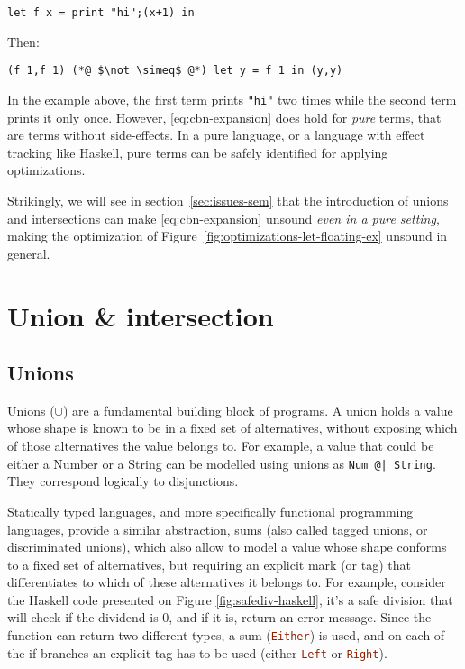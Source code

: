 \documentclass[sigplan,10pt,review,anonymous]{acmart}
\newcommand{\info}[2][1=]{}
\newcommand{\nickel}[1]{\lstinline[language=nickel]{#1}}
\newcommand{\haskell}[1]{\lstinline[language=Haskell]{#1}}
\begin{document}
\begin{lstlisting}[language=Nickel]
let f x = print "hi";(x+1) in
\end{lstlisting}

Then:

\begin{lstlisting}[language=Nickel]
(f 1,f 1) (*@ $\not \simeq$ @*) let y = f 1 in (y,y)
\end{lstlisting}

In the example above, the first term prints \nickel{"hi"} two times while the
second term prints it only once. However, \ref{eq:cbn-expansion} does hold for
\emph{pure} terms, that are terms without side-effects. In a pure language, or a
language with effect tracking like Haskell, pure terms can be safely identified for applying
optimizations.

Strikingly, we will see in section~\ref{sec:issues-sem} that the introduction of
unions and intersections can make \ref{eq:cbn-expansion} unsound
\emph{even in a pure setting}, making the optimization of
Figure~\ref{fig:optimizations-let-floating-ex} unsound in general.


\section{Union \& intersection}
\label{sec:union-inter}
\info{What are they, what are they used for.}


\subsection{Unions}
Unions ($\cup$) are a fundamental building block of programs.
A union holds a value whose
shape is known to be in a fixed set of alternatives, without exposing
which of those alternatives the value belongs to.
For example, a value that could be either a Number or a String can be
modelled using unions as \nickel{Num @| String}.
They correspond logically to disjunctions.

Statically typed languages, and more specifically functional programming
languages, provide a similar abstraction, sums
(also called tagged unions, or discriminated unions), which
also allow to model a value whose shape conforms to a fixed set of
alternatives, but requiring an explicit mark (or tag) that differentiates
to which of these alternatives it belongs to.
For example, consider the Haskell code presented on Figure
\ref{fig:safediv-haskell}, it's a safe division that will
check if the dividend is 0, and if it is, return an
error message.
Since the function can return two different types, a sum
(\haskell{Either}) is used, and on each
of the if branches an explicit tag has to be used (either
\haskell{Left} or \haskell{Right}).
\end{document}
